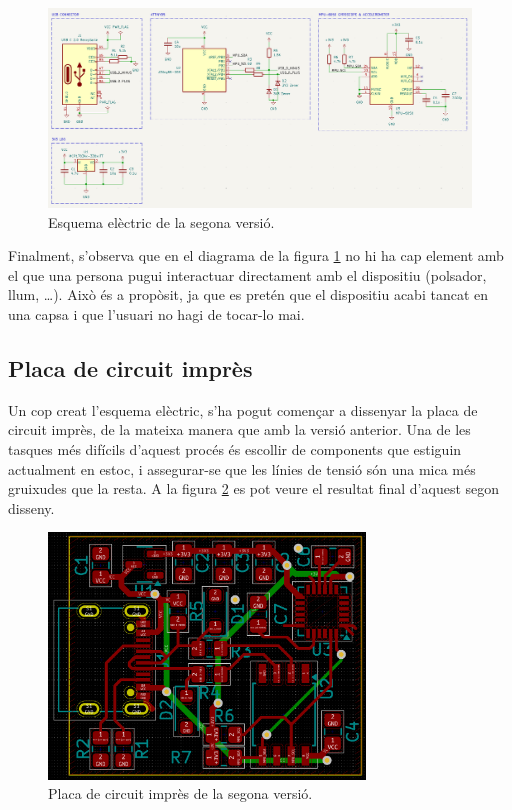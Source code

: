 \begin{figure}[ht]
    \centering
    \includegraphics[width=1\textwidth]{images/kicad/gyro2_sch.png}
    \caption{Esquema elèctric de la segona versió.}
    \label{fig:sch_v2}
\end{figure}

Finalment, s'observa que en el diagrama de la figura \ref{fig:sch_v2}
no hi ha cap element amb el que una
persona pugui interactuar directament amb el dispositiu (polsador, llum, \dots).
Això és a propòsit, ja que es pretén que el dispositiu acabi tancat en una capsa
i que l'usuari no hagi de tocar-lo mai.

\subsection{Placa de circuit imprès}

Un cop creat l'esquema elèctric, s'ha pogut començar a dissenyar la placa de
circuit imprès, de la mateixa manera que amb la versió anterior. Una de les
tasques més difícils d'aquest procés és escollir  de components
que estiguin actualment en estoc, i assegurar-se que les línies de tensió
són una mica més gruixudes que la resta. A la figura \ref{fig:pcb_v2}
es pot veure el resultat
final d'aquest segon disseny.

\begin{figure}[ht]
    \centering
    \includegraphics[width=0.75\textwidth]{images/kicad/gyro2_pcb.png}
    \caption{Placa de circuit imprès de la segona versió.}
    \label{fig:pcb_v2}
\end{figure}

